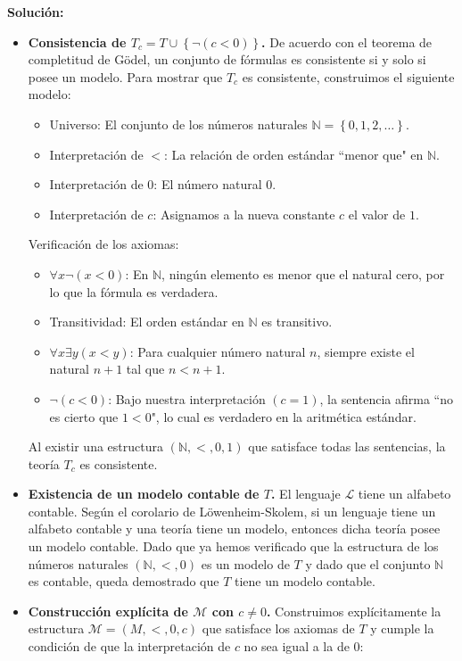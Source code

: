 \textbf{Solución:}
\begin{itemize}
   \item \textbf{Consistencia de $T_c=T \cup \left\lbrace \neg(c<0)\right\rbrace$.} De acuerdo con el teorema de completitud de Gödel, un conjunto de fórmulas es consistente si y solo si posee un modelo. Para mostrar que $T_c$ es consistente, construimos el siguiente modelo:
      \begin{itemize}
         \item Universo: El conjunto de los números naturales $\mathbb{N}=\left\lbrace 0,1,2,\dots \right\rbrace$.
         \item Interpretación de $<$: La relación de orden estándar ``menor que" en $\mathbb{N}$.
         \item Interpretación de $0$: El número natural $0$.
         \item Interpretación de $c$: Asignamos a la nueva constante $c$ el valor de $1$.
      \end{itemize}
      Verificación de los axiomas:
      \begin{itemize}
         \item $\forall x \neg (x<0)$: En $\mathbb{N}$, ningún elemento es menor que el natural cero, por lo que la fórmula es verdadera.
         \item Transitividad: El orden estándar en $\mathbb{N}$ es transitivo.
         \item $\forall x \exists y (x<y)$: Para cualquier número natural $n$, siempre existe el natural $n+1$ tal que $n<n+1$.
         \item $\neg(c<0)$: Bajo nuestra interpretación $(c=1)$, la sentencia afirma ``no es cierto que $1<0$", lo cual es verdadero en la aritmética estándar.
      \end{itemize}
      Al existir una estructura $(\mathbb{N},<,0,1)$ que satisface todas las sentencias, la teoría $T_c$ es consistente.
   \item \textbf{Existencia de un modelo contable de $T$.} El lenguaje $\mathcal{L}$ tiene un alfabeto contable. Según el corolario de Löwenheim-Skolem, si un lenguaje tiene un alfabeto contable y una teoría tiene un modelo, entonces dicha teoría posee un modelo contable. Dado que ya hemos verificado que la estructura de los números naturales $(\mathbb{N},<,0)$ es un modelo de $T$ y dado que el conjunto $\mathbb{N}$ es contable, queda demostrado que $T$ tiene un modelo contable.
   \item \textbf{Construcción explícita de $\mathcal{M}$ con $c\neq 0$.} Construimos explícitamente la estructura $\mathcal{M}=(M,<,0,c)$ que satisface los axiomas de $T$ y cumple la condición de que la interpretación de $c$ no sea igual a la de $0$:

\end{itemize}
